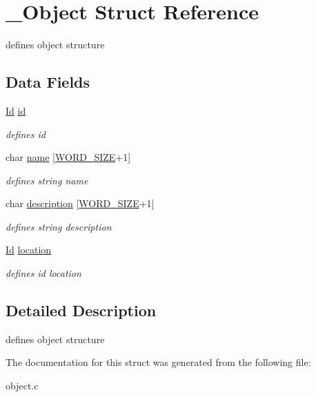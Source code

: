 \hypertarget{struct__Object}{}\section{\+\_\+\+Object Struct Reference}
\label{struct__Object}


defines object structure  


\subsection*{Data Fields}
\begin{DoxyCompactItemize}
\item 
\mbox{\label{struct__Object_a3cff7a0e8dc4e9d23895ed9af1b7653a}} 
\hyperlink{types_8h_a845e604fb28f7e3d97549da3448149d3}{Id} \hyperlink{struct__Object_a3cff7a0e8dc4e9d23895ed9af1b7653a}{id}
\begin{DoxyCompactList}\small\item\em defines id \end{DoxyCompactList}\item 
\mbox{\label{struct__Object_a03fb9b8d91f071e8e30d669be79cc040}} 
char \hyperlink{struct__Object_a03fb9b8d91f071e8e30d669be79cc040}{name} \mbox{[}\hyperlink{types_8h_a92ed8507d1cd2331ad09275c5c4c1c89}{W\+O\+R\+D\+\_\+\+S\+I\+ZE}+1\mbox{]}
\begin{DoxyCompactList}\small\item\em defines string name \end{DoxyCompactList}\item 
\mbox{\label{struct__Object_add691deed525492ad692cc2f5bccfe90}} 
char \hyperlink{struct__Object_add691deed525492ad692cc2f5bccfe90}{description} \mbox{[}\hyperlink{types_8h_a92ed8507d1cd2331ad09275c5c4c1c89}{W\+O\+R\+D\+\_\+\+S\+I\+ZE}+1\mbox{]}
\begin{DoxyCompactList}\small\item\em defines string description \end{DoxyCompactList}\item 
\mbox{\label{struct__Object_a3c596b8898734de2f71fd1a33dfa72fb}} 
\hyperlink{types_8h_a845e604fb28f7e3d97549da3448149d3}{Id} \hyperlink{struct__Object_a3c596b8898734de2f71fd1a33dfa72fb}{location}
\begin{DoxyCompactList}\small\item\em defines id location \end{DoxyCompactList}\end{DoxyCompactItemize}


\subsection{Detailed Description}
defines object structure 

The documentation for this struct was generated from the following file\+:\begin{DoxyCompactItemize}
\item 
object.\+c\end{DoxyCompactItemize}
